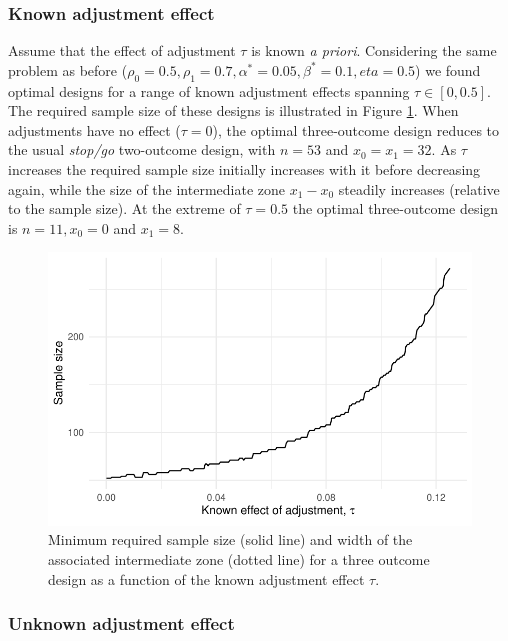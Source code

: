 \documentclass{bmcart}
\begin{document}
\subsubsection{Known adjustment effect}

Assume that the effect of adjustment $\tau$ is known \emph{a priori}. Considering the same problem as before ($\rho_0 = 0.5, \rho_1 = 0.7, \alpha^* = 0.05, \beta^* = 0.1, eta = 0.5$) we found optimal designs for a range of known adjustment effects spanning $\tau \in [0, 0.5]$. The required sample size of these designs is illustrated in Figure \ref{fig:tau_ns}. When adjustments have no effect ($\tau = 0$), the optimal three-outcome design reduces to the usual \emph{stop/go} two-outcome design, with $n = 53$ and $x_0 = x_1 = 32$. As $\tau$ increases the required sample size initially increases with it before decreasing again, while the size of the intermediate zone $x_1 - x_0$ steadily increases (relative to the sample size). At the extreme of $\tau = 0.5$ the optimal three-outcome design is $n= 11, x_0 = 0$ and $x_1 = 8$.

\begin{figure}
\centering
\includegraphics[scale=0.8]{./figures/tau_ns}
\caption{Minimum required sample size (solid line) and width of the associated intermediate zone (dotted line) for a three outcome design as a function of the known adjustment effect $\tau$.}
\label{fig:tau_ns}
\end{figure}

\subsubsection{Unknown adjustment effect}
\end{document}
